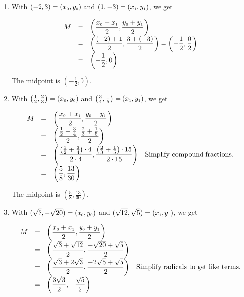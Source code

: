 \begin{ex}
\begin{enumerate}
\item  With $(-2,3) =  \left(x_{\mbox{\tiny$0$}}, y_{\mbox{\tiny$0$}}\right)$ and  $(1,-3) = \left(x_{\mbox{\tiny$1$}}, y_{\mbox{\tiny$1$}}\right)$, we get

\setlength{\extrarowheight}{10pt}

\[ \begin{array}{rcl}
 M & = & \left( \dfrac{x_{\mbox{\tiny$0$}}+x_{\mbox{\tiny$1$}}}{2},  \dfrac{y_{\mbox{\tiny$0$}}+y_{\mbox{\tiny$1$}}}{2} \right) \\
   & = & \left( \dfrac{(-2)+1}{2},  \dfrac{3+(-3)}{2} \right)  = \left(- \dfrac{1}{2}, \dfrac{0}{2} \right) \\
   & = & \left(- \dfrac{1}{2}, 0 \right) 
   \end{array} \]
   
The midpoint is  $\left(- \frac{1}{2}, 0 \right)$.  

\item With $\left( \frac{1}{2}, \frac{2}{3}\right) =  \left(x_{\mbox{\tiny$0$}}, y_{\mbox{\tiny$0$}}\right)$ and  $\left( \frac{3}{4}, \frac{1}{5}\right) = \left(x_{\mbox{\tiny$1$}}, y_{\mbox{\tiny$1$}}\right)$, we get

\setlength{\extrarowheight}{10pt}

\[ \begin{array}{rclr}
 M & = & \left( \dfrac{x_{\mbox{\tiny$0$}}+x_{\mbox{\tiny$1$}}}{2},  \dfrac{y_{\mbox{\tiny$0$}}+y_{\mbox{\tiny$1$}}}{2} \right) & \\
   & = & \left( \dfrac{\frac{1}{2} + \frac{3}{4}}{2},  \dfrac{\frac{2}{3} + \frac{1}{5}}{2} \right) &   \\
   & = &  \left( \dfrac{\left(\frac{1}{2} + \frac{3}{4}\right) \cdot 4}{2 \cdot 4},  \dfrac{\left(\frac{2}{3} + \frac{1}{5}\right) \cdot 15}{2 \cdot 15} \right) & \text{Simplify compound fractions.} \\ 
   & = & \left(\dfrac{5}{8}, \dfrac{13}{30} \right) &  \end{array} \]
   
   

The midpoint is $\left(\frac{5}{8}, \frac{13}{30} \right)$.

\item   With $(\sqrt{3}, -\sqrt{20}) =  \left(x_{\mbox{\tiny$0$}}, y_{\mbox{\tiny$0$}}\right)$ and  $(\sqrt{12}, \sqrt{5}) = \left(x_{\mbox{\tiny$1$}}, y_{\mbox{\tiny$1$}}\right)$, we get

\setlength{\extrarowheight}{10pt}

\[ \begin{array}{rclr}
 M & = & \left( \dfrac{x_{\mbox{\tiny$0$}}+x_{\mbox{\tiny$1$}}}{2},  \dfrac{y_{\mbox{\tiny$0$}}+y_{\mbox{\tiny$1$}}}{2} \right) & \\
   & = & \left( \dfrac{\sqrt{3} + \sqrt{12}}{2},  \dfrac{-\sqrt{20}+\sqrt{5}}{2} \right) &   \\
   & = &  \left( \dfrac{\sqrt{3}+2\sqrt{3}}{2},  \dfrac{-2\sqrt{5} + \sqrt{5}}{2} \right) & \text{Simplify radicals to get like terms.} \\ 
   & = & \left(\dfrac{3\sqrt{3}}{2}, -\dfrac{\sqrt{5}}{2} \right) &  \end{array} \]
   

\end{enumerate}
\end{ex}
